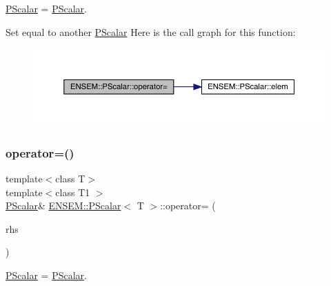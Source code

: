\mbox{\hyperlink{classENSEM_1_1PScalar}{P\+Scalar}} = \mbox{\hyperlink{classENSEM_1_1PScalar}{P\+Scalar}}. 

Set equal to another \mbox{\hyperlink{classENSEM_1_1PScalar}{P\+Scalar}} Here is the call graph for this function\+:
\nopagebreak
\begin{figure}[H]
\begin{center}
\leavevmode
\includegraphics[width=350pt]{d3/d27/classENSEM_1_1PScalar_ae69d6f1ad8ec0b65652f8d16c5f97b11_cgraph}
\end{center}
\end{figure}
\mbox{\label{classENSEM_1_1PScalar_ae69d6f1ad8ec0b65652f8d16c5f97b11}} 
\subsubsection{\texorpdfstring{operator=()}{operator=()}\hspace{0.1cm}{\footnotesize\ttfamily [4/4]}}
{\footnotesize\ttfamily template$<$class T$>$ \\
template$<$class T1 $>$ \\
\mbox{\hyperlink{classENSEM_1_1PScalar}{P\+Scalar}}\& \mbox{\hyperlink{classENSEM_1_1PScalar}{E\+N\+S\+E\+M\+::\+P\+Scalar}}$<$ T $>$\+::operator= (\begin{DoxyParamCaption}\item[{const \mbox{\hyperlink{classENSEM_1_1PScalar}{P\+Scalar}}$<$ T1 $>$ \&}]{rhs }\end{DoxyParamCaption})\hspace{0.3cm}{\ttfamily [inline]}}



\mbox{\hyperlink{classENSEM_1_1PScalar}{P\+Scalar}} = \mbox{\hyperlink{classENSEM_1_1PScalar}{P\+Scalar}}. 

